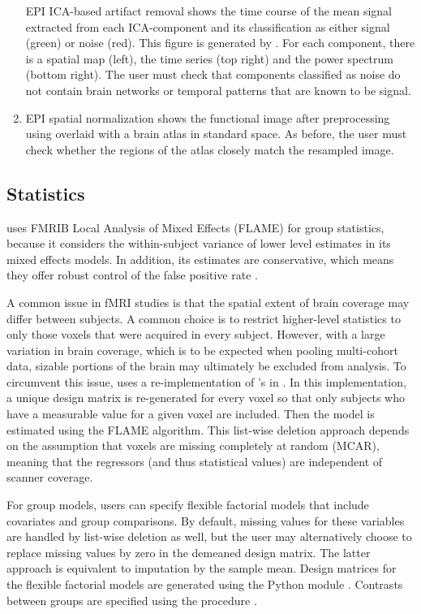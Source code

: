 \begin{enumerate}[leftmargin=*]
EPI ICA-based artifact removal shows the time course of the mean signal
extracted from each ICA-component and its classification as either signal
(green) or noise (red). This figure is generated by . For
each component, there is a spatial map (left), the time series (top right)
and the power spectrum (bottom right). The user must check that components
classified as noise do not contain brain networks or temporal patterns that
are known to be signal.

\item

EPI spatial normalization shows the functional image after preprocessing
using  overlaid with a brain atlas in standard space. As
before, the user must check whether the regions of the atlas closely match
the resampled image.

\end{enumerate}

\subsection{Statistics}\label{sec:statistics}

 uses  FMRIB Local Analysis of Mixed Effects
(FLAME) \parencite{10.1016/j.neuroimage.2003.12.023} for group statistics,
because it considers the within-subject variance of lower level estimates
in its mixed effects models. In addition, its estimates are conservative,
which means they offer robust control of the false positive rate
\parencite{10.1073/pnas.1602413113}.

A common issue in fMRI studies is that the spatial extent of brain coverage
may differ between subjects. A common choice is to restrict higher-level
statistics to only those voxels that were acquired in every subject.
However, with a large variation in brain coverage, which is to be expected
when pooling multi-cohort data, sizable portions of the brain may
ultimately be excluded from analysis. To circumvent this issue,
 uses a re-implementation of 's  in
 \parencite{10.1038/s41586-020-2649-2}. In this implementation, a
unique design matrix is re-generated for every voxel so that only subjects
who have a measurable value for a given voxel are included. Then the model
is estimated using the FLAME algorithm. This list-wise deletion approach
depends on the assumption that voxels are missing completely at random
(MCAR), meaning that the regressors (and thus statistical values) are
independent of scanner coverage.

For group models, users can specify flexible factorial models that include
covariates and group comparisons. By default, missing values for these
variables are handled by list-wise deletion as well, but the user may
alternatively choose to replace missing values by zero in the demeaned
design matrix. The latter approach is equivalent to imputation by the
sample mean. Design matrices for the flexible factorial models are
generated using the Python module 
\parencite{nathaniel_j_smith_2018_1472929}. Contrasts between groups are
specified using the  procedure \parencite{jssv069i01}.


